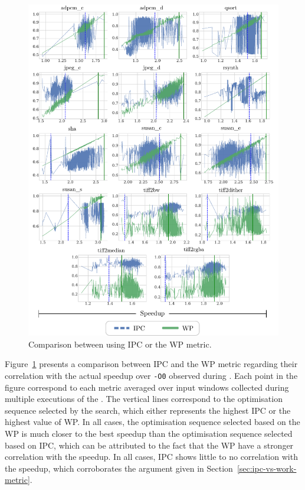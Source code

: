 \begin{figure}[h!]
    \centering
    \includegraphics[width=\textwidth]{figs/ipc-vs-work.pdf}
    \caption{Comparison between {\itercomp} using IPC or the WP metric.}
    \label{fig:ipc-vs-work}
\end{figure}


Figure~\ref{fig:ipc-vs-work} presents a comparison between IPC and the WP metric regarding their correlation with the actual speedup over \verb|-O0| observed during {\itercomp}.
Each point in the figure correspond to each metric averaged over input windows collected during multiple executions of the {\itercomp}.
The vertical lines correspond to the optimisation sequence selected by the {\itercomp} search, which either represents the highest IPC or the highest value of WP.
In all cases, the optimisation sequence selected based on the WP is much closer to the best speedup than the optimisation sequence selected based on IPC, which can be attributed to the fact that the WP have a stronger correlation with the speedup.
In all cases, IPC shows little to no correlation with the speedup, which corroborates the argument given in Section~\ref{sec:ipc-vs-work-metric}.

